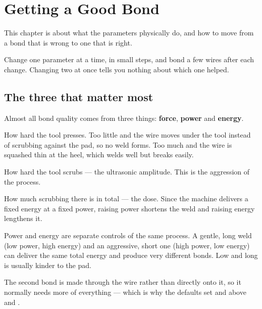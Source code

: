 \chapter{Getting a Good Bond}
\label{ch:tuning}

This chapter is about what the parameters physically do, and how to move from
a bond that is wrong to one that is right.

\begin{wbwarning}
Change one parameter at a time, in small steps, and bond a few wires after each
change. Changing two at once tells you nothing about which one helped.
\end{wbwarning}

\section{The three that matter most}

Almost all bond quality comes from three things: \textbf{force}, \textbf{power}
and \textbf{energy}.

\begin{description}[leftmargin=!,labelwidth=26mm,style=nextline,font=\normalfont\bfseries]

\item[Force] How hard the tool presses. Too little and the wire moves under the
  tool instead of scrubbing against the pad, so no weld forms. Too much and the
  wire is squashed thin at the heel, which welds well but breaks easily.

\item[Power] How hard the tool scrubs --- the ultrasonic amplitude. This is the
  aggression of the process.

\item[Energy] How much scrubbing there is in total --- the dose. Since the
  machine delivers a fixed energy at a fixed power, raising power shortens the
  weld and raising energy lengthens it.

\end{description}

\begin{wbnote}
Power and energy are separate controls of the same process. A gentle, long weld
(low power, high energy) and an aggressive, short one (high power, low energy)
can deliver the same total energy and produce very different bonds. Low and
long is usually kinder to the pad.
\end{wbnote}

The second bond is made through the wire rather than directly onto it, so it
normally needs more of everything --- which is why the defaults set
 and  above  and
.

